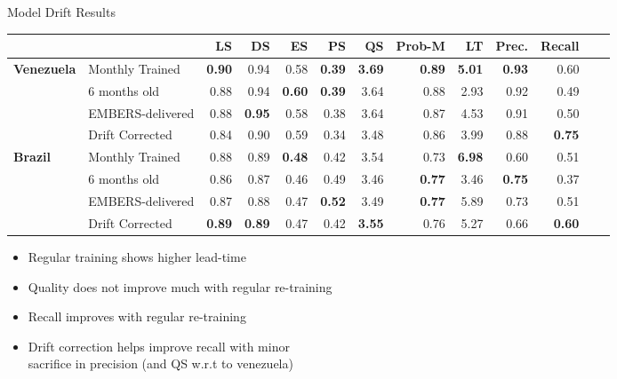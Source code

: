 \begin{frame}{Model Drift Results}
\vspace{-1em}
\begin{table}
\scriptsize
\begin{tabular}{p{1.5 cm}p{2cm}rrrrrrrrrrr}
\toprule
& & LS &  DS &  ES &  PS &  QS &  Prob-M &  LT &  Prec. &  Recall \\
\midrule
\textbf{Venezuela} &   Monthly Trained  & \textbf{0.90} &    0.94 &    0.58 &    \textbf{0.39} &   \textbf{ 3.69} &        \textbf{0.89} &    \textbf{5.01} &       \textbf{0.93} &    0.60 \\
         &      6 months old   & 0.88 &    0.94 &    \textbf{0.60} &    \textbf{0.39} &    3.64 &        0.88 &    2.93 &       0.92 &    0.49 \\
         &  EMBERS-delivered   & 0.88 &    \textbf{0.95} &    0.58 &    0.38 &    3.64 &        0.87 &    4.53 &       0.91 &    0.50 \\
         &   Drift Corrected   & 0.84 &    0.90 &    0.59 &    0.34 &    3.48 &        0.86 &    3.99 &       0.88 &    \textbf{0.75} \\
\midrule
\textbf{Brazil}   &   Monthly Trained   & 0.88 &    0.89 &    \textbf{0.48} &    0.42 &    3.54 &        0.73 &    \textbf{6.98} &       0.60 &    0.51 \\
         &      6 months old   & 0.86 &    0.87 &    0.46 &    0.49 &    3.46 &        \textbf{0.77} &    3.46 &       \textbf{0.75} &    0.37 \\
         &  EMBERS-delivered   & 0.87 &    0.88 &    0.47 &    \textbf{0.52} &    3.49 &        \textbf{0.77} &    5.89 &       0.73 &    0.51 \\
         &   Drift Corrected   &\textbf{0.89} &    \textbf{0.89} &    0.47 &    0.42 &    \textbf{3.55} &        0.76 &    5.27 &       0.66 &    \textbf{0.60} \\
\bottomrule
\end{tabular}
\end{table}

\begin{itemize}
\small
    \item Regular training shows higher lead-time
    \item Quality does not improve much with regular re-training
    \item Recall improves with regular re-training
    \item Drift correction helps improve recall with minor\\ sacrifice in precision (and QS w.r.t to venezuela)
\end{itemize}
\end{frame}

